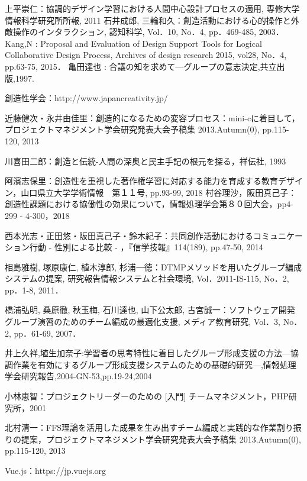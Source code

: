 \documentclass{funthesis}
\begin{document}
\begin{thebibliography}{9}
  上平崇仁：協調的デザイン学習における人間中心設計プロセスの適用, 専修大学情報科学研究所所報, 2011
石井成郎, 三輪和久：創造活動における心的操作と外敵操作のインタラクション, 認知科学, Vol．10, No．4, pp．469-485, 2003．
Kang,N : Proposal and Evaluation of Design
Support Tools for Logical Collaborative Design Process, Archives of design research 2015, vol28, No．4, pp.63-75, 2015．
亀田達也 : 合議の知を求めて—グループの意志決定,共立出版,1997.

創造性学会：http://www.japancreativity.jp/

近藤健次・永井由佳里：創造的になるための変容プロセス：mini-cに着目して，プロジェクトマネジメント学会研究発表大会予稿集 2013.Autumn(0), pp.115-120, 2013

川喜田二郎：創造と伝統-人間の深奥と民主手記の根元を探る，祥伝社, 1993

阿濱志保里：創造性を重視した著作権学習に対応する能力を育成する教育デザイン，山口県立大学学術情報　第１１号, pp.93-99, 2018
村谷理沙，阪田真己子：創造性課題における協働性の効果について，情報処理学会第８０回大会，pp4-299 - 4-300，2018

西本光志・正田悠・阪田真己子・鈴木紀子：共同創作活動におけるコミュニケーション行動 - 性別による比較 - ，『信学技報』114(189), pp.47-50, 2014

相島雅樹, 塚原康仁, 植木淳郎, 杉浦一徳：DTMPメソッドを用いたグループ編成システムの提案, 研究報告情報システムと社会環境, Vol．2011-IS-115, No．2, pp．1-8, 2011．

橋浦弘明, 桑原徹, 秋玉梅, 石川達也, 山下公太郎, 古宮誠一：ソフトウェア開発グループ演習のためのチーム編成の最適化支援, メディア教育研究, Vol．3, No．2, pp．61-69, 2007． 

井上久祥,埴生加奈子:学習者の思考特性に着目したグループ形成支援の方法—協調作業を有効にするグループ形成支援システムのための基礎的研究—,情報処理学会研究報告,2004-GN-53,pp.19-24,2004

小林恵智：プロジェクトリーダーのための [入門] チームマネジメント，PHP研究所，2001

北村清一：FFS理論を活用した成果を生み出すチーム編成と実践的な作業割り振りの提案，プロジェクトマネジメント学会研究発表大会予稿集 2013.Autumn(0), pp.115-120, 2013

Vue.js：https://jp.vuejs.org


\end{thebibliography}
\end{document}
